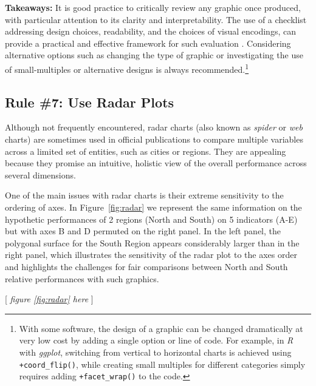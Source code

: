\documentclass[11pt,twoside,a4paper]{article}
\begin{document}
\noindent \textbf{ Takeaways:} It is good practice to critically review any graphic once produced, with particular attention to its clarity and interpretability. The use of a checklist addressing design choices, readability, and the choices of visual encodings, can provide a practical and effective framework for such evaluation \citep{Gordon2014}. Considering alternative options such as changing the type of graphic or investigating the use of small-multiples or alternative designs is always recommended.\footnote{With some software, the design of a graphic can be changed dramatically at very low cost by adding a single option or line of code. For example, in \textit{R} with \textit{ggplot}, switching from vertical to horizontal charts is achieved using \texttt{+coord\_flip()}, while creating small multiples for different categories simply requires adding \texttt{+facet\_wrap()} to the code.} 



\subsection*{Rule \#7: Use Radar Plots}

Although not frequently encountered, radar charts (also known as \textit{spider} or \textit{web} charts) are sometimes used in official publications to compare multiple variables across a limited set of entities, such as cities or regions.  They are appealing because they promise an intuitive, holistic view of the overall performance across several dimensions. 

One of the main issues with radar charts is their extreme sensitivity to the ordering of axes.  In Figure~\ref{fig:radar} we represent the same information on the hypothetic performances of 2 regions (North and South) on 5 indicators (A-E) but with axes B and D permuted on the right panel. In the left panel, the polygonal surface for the South Region appears considerably larger than in the right panel, which illustrates the sensitivity of the radar plot to the axes order and highlights the challenges for fair comparisons between North and South relative performances with such graphics.   

\begin{center}
    [ \textit{figure \ref{fig:radar}  here}  ]
\end{center}

\end{document}
